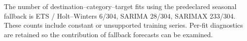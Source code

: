 The number of destination--category--target fits using the predeclared seasonal fallback is ETS / Holt--Winters 6/304, SARIMA 28/304, SARIMAX 233/304. These counts include constant or unsupported training series. Per-fit diagnostics are retained so the contribution of fallback forecasts can be examined.
